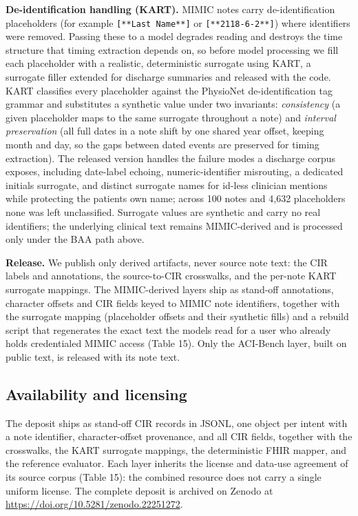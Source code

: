 \textbf{De-identification handling (KART).} MIMIC notes carry de-identification placeholders (for example \texttt{{[}**Last\ Name**{]}} or \texttt{{[}**2118-6-2**{]}}) where identifiers were removed. Passing these to a model degrades reading and destroys the time structure that timing extraction depends on, so before model processing we fill each placeholder with a realistic, deterministic surrogate using KART, a surrogate filler extended for discharge summaries and released with the code. KART classifies every placeholder against the PhysioNet de-identification tag grammar and substitutes a synthetic value under two invariants: \emph{consistency} (a given placeholder maps to the same surrogate throughout a note) and \emph{interval preservation} (all full dates in a note shift by one shared year offset, keeping month and day, so the gaps between dated events are preserved for timing extraction). The released version handles the failure modes a discharge corpus exposes, including date-label echoing, numeric-identifier misrouting, a dedicated initials surrogate, and distinct surrogate names for id-less clinician mentions while protecting the patient\textquotesingle s own name; across 100 notes and 4,632 placeholders none was left unclassified. Surrogate values are synthetic and carry no real identifiers; the underlying clinical text remains MIMIC-derived and is processed only under the BAA path above.

\textbf{Release.} We publish only derived artifacts, never source note text: the CIR labels and annotations, the source-to-CIR crosswalks, and the per-note KART surrogate mappings. The MIMIC-derived layers ship as stand-off annotations, character offsets and CIR fields keyed to MIMIC note identifiers, together with the surrogate mapping (placeholder offsets and their synthetic fills) and a rebuild script that regenerates the exact text the models read for a user who already holds credentialed MIMIC access (Table 15). Only the ACI-Bench layer, built on public text, is released with its note text.

\subsection{Availability and licensing}\label{availability-and-licensing}

The deposit ships as stand-off CIR records in JSONL, one object per intent with a note identifier, character-offset provenance, and all CIR fields, together with the crosswalks, the KART surrogate mappings, the deterministic FHIR mapper, and the reference evaluator. Each layer inherits the license and data-use agreement of its source corpus (Table 15): the combined resource does not carry a single uniform license. The complete deposit is archived on Zenodo at \url{https://doi.org/10.5281/zenodo.22251272}.

